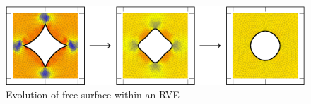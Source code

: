 \documentclass[11pt,mathserif]{beamer}
\begin{document}
\begin{frame}
\begin{figure}[hbpt]
 \centering
 \includegraphics{figures/rve_evolve.pdf} %
 \caption{Evolution of free surface within an RVE}\label{fig:rve_evolution}
\end{figure}
\end{frame}
\end{document}
